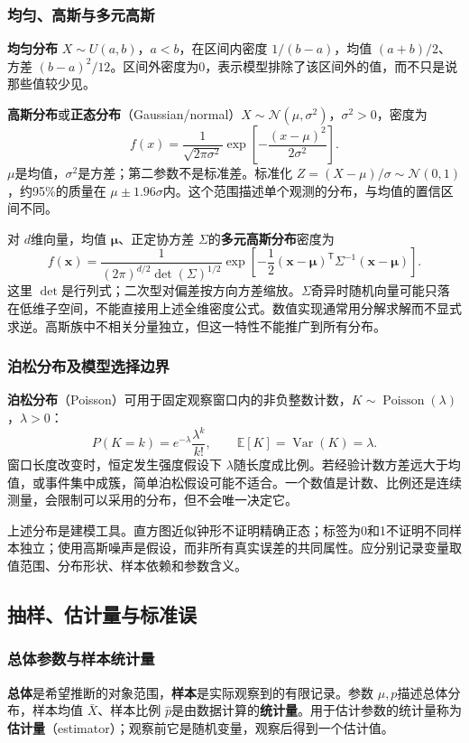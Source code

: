 \documentclass[UTF8,fontset=none,zihao=-4,a4paper]{ctexart}
\newcommand{\term}[1]{\textbf{#1}}
\numberwithin{equation}{section}
\numberwithin{figure}{section}
\begin{document}
\subsubsection{均匀、高斯与多元高斯}
\term{均匀分布} $X\sim U(a,b)$，$a<b$，在区间内密度 $1/(b-a)$，均值 $(a+b)/2$、方差 $(b-a)^2/12$。区间外密度为0，表示模型排除了该区间外的值，而不只是说那些值较少见。

\term{高斯分布}或\term{正态分布}（Gaussian/normal）$X\sim\mathcal N(\mu,\sigma^2)$，$\sigma^2>0$，密度为
\[
 f(x)=\frac1{\sqrt{2\pi\sigma^2}}
 \exp\left[-\frac{(x-\mu)^2}{2\sigma^2}\right].
\]
$\mu$是均值，$\sigma^2$是方差；第二参数不是标准差。标准化 $Z=(X-\mu)/\sigma\sim\mathcal N(0,1)$，约95\%的质量在 $\mu\pm1.96\sigma$内。这个范围描述单个观测的分布，与均值的置信区间不同。

对 $d$维向量，均值 $\symbf\mu$、正定协方差 $\Sigma$的\term{多元高斯分布}密度为
\[
 f(\symbf x)=\frac1{(2\pi)^{d/2}\det(\Sigma)^{1/2}}
 \exp\left[-\frac12(\symbf x-\symbf\mu)^{\mathsf T}\Sigma^{-1}(\symbf x-\symbf\mu)\right].
\]
这里 $\det$是行列式；二次型对偏差按方向方差缩放。$\Sigma$奇异时随机向量可能只落在低维子空间，不能直接用上述全维密度公式。数值实现通常用分解求解而不显式求逆。高斯族中不相关分量独立，但这一特性不能推广到所有分布。

\subsubsection{泊松分布及模型选择边界}
\term{泊松分布}（Poisson）可用于固定观察窗口内的非负整数计数，$K\sim\operatorname{Poisson}(\lambda)$，$\lambda>0$：
\[
 P(K=k)=e^{-\lambda}\frac{\lambda^k}{k!},\qquad
 \mathbb E[K]=\operatorname{Var}(K)=\lambda.
\]
窗口长度改变时，恒定发生强度假设下 $\lambda$随长度成比例。若经验计数方差远大于均值，或事件集中成簇，简单泊松假设可能不适合。一个数值是计数、比例还是连续测量，会限制可以采用的分布，但不会唯一决定它。

上述分布是建模工具。直方图近似钟形不证明精确正态；标签为0和1不证明不同样本独立；使用高斯噪声是假设，而非所有真实误差的共同属性。应分别记录变量取值范围、分布形状、样本依赖和参数含义。

\subsection{抽样、估计量与标准误}
\subsubsection{总体参数与样本统计量}
\term{总体}是希望推断的对象范围，\term{样本}是实际观察到的有限记录。参数 $\mu,p$描述总体分布，样本均值 $\bar X$、样本比例 $\hat p$是由数据计算的\term{统计量}。用于估计参数的统计量称为\term{估计量}（estimator）；观察前它是随机变量，观察后得到一个估计值。
\end{document}
